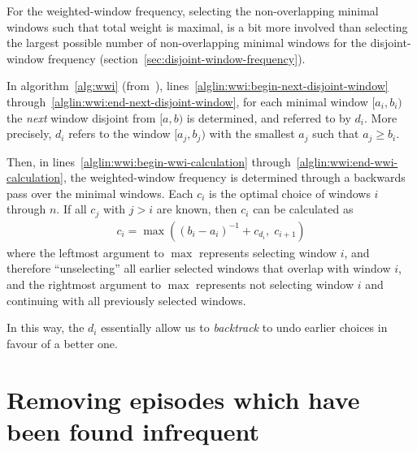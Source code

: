 For the weighted-window frequency, selecting the non-overlapping minimal windows such that total weight is maximal, is a bit more involved than selecting the largest possible number of non-overlapping minimal windows for the disjoint-window frequency (section~\ref{sec:disjoint-window-frequency}).

In algorithm~\ref{alg:wwi} (from~\cite{cule2014marbles}), lines~\ref{alglin:wwi:begin-next-disjoint-window} through~\ref{alglin:wwi:end-next-disjoint-window}, for each minimal window $ [a_i, b_i) $ the \emph{next} window disjoint from $ [a, b) $ is determined, and referred to by $ d_i $. More precisely, $ d_i $ refers to the window $ [a_j, b_j) $ with the smallest $ a_j $ such that $ a_j \geq b_i $.

Then, in lines~\ref{alglin:wwi:begin-wwi-calculation} through~\ref{alglin:wwi:end-wwi-calculation}, the weighted-window frequency is determined through a backwards pass over the minimal windows. Each $ c_i $ is the optimal choice of windows $ i $ through $ n $. If all $ c_j $ with $ j > i $ are known, then $ c_i $ can be calculated as
\begin{align*}
c_i = \max((b_i - a_i)^{-1} + c_{d_i}, \; c_{i+1})
\end{align*}
where the leftmost argument to $ \max $ represents selecting window $ i $, and therefore ``unselecting'' all earlier selected windows that overlap with window $ i $, and the rightmost argument to $ \max $ represents not selecting window $ i $ and continuing with all previously selected windows.

In this way, the $ d_i $ essentially allow us to \emph{backtrack} to undo earlier choices in favour of a better one.



\section{Removing episodes which have been found infrequent}
\label{sec:maintain-blocks}

